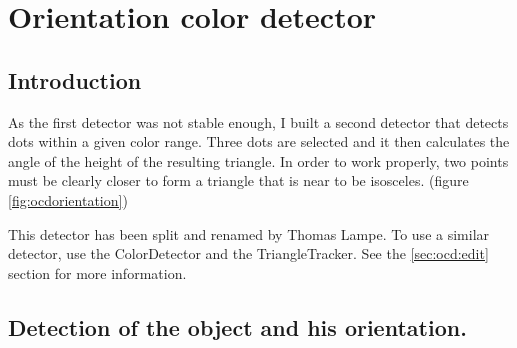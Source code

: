 \section[Orientation color detector (Triangle tracker)]{Orientation color detector}
\label{sec:ocd}

\subsection{Introduction}
\label{sec:ocd:intro}

As the first detector was not stable enough, I built a second detector 
that detects dots within a given color range. Three dots are selected 
and it then calculates the angle of the height of the resulting triangle. 
In order to work properly, two points must be clearly closer to form a 
triangle that is near to be isosceles. (figure \ref{fig:ocdorientation})

This detector has been split and renamed by Thomas Lampe. 
To use a similar detector, 
use the ColorDetector and the 
TriangleTracker. See the \ref{sec:ocd:edit} section for more 
information.



\subsection{Detection of the object and his orientation.}
\label{sec:ocd:detection}


